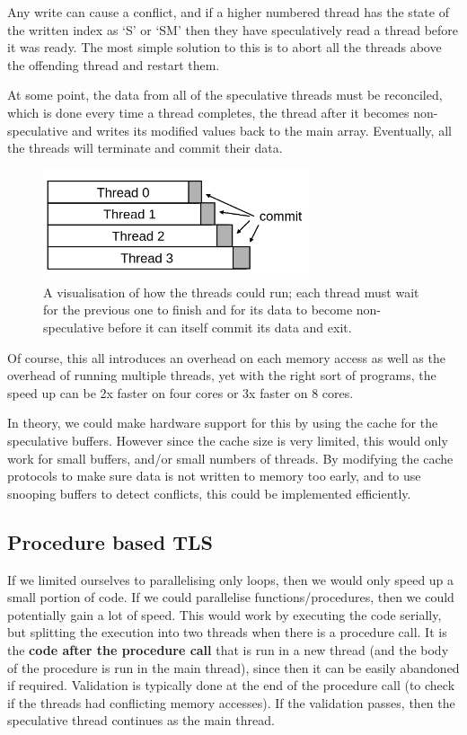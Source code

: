 Any write can cause a conflict, and if a higher numbered thread has
the state of the written index as `S' or `SM' then they have
speculatively read a thread before it was ready. The most simple
solution to this is to abort all the threads above the offending
thread and restart them.

At some point, the data from all of the speculative threads must be
reconciled, which is done every time a thread completes, the thread
after it becomes non-speculative and writes its modified values back
to the main array. Eventually, all the threads will terminate and
commit their data.

\begin{figure}[H]
\centering
\includegraphics[width=0.7\textwidth]{diagrams/commit-diagram}
\caption{A visualisation of how the threads could run; each thread
must wait for the previous one to finish and for its data to become
non-speculative before it can itself commit its data and exit.}
\end{figure}

Of course, this all introduces an overhead on each memory access as
well as the overhead of running multiple threads, yet with the right
sort of programs, the speed up can be 2x faster on four cores or 3x
faster on 8 cores.

In theory, we could make hardware support for this by using the cache
for the speculative buffers. However since the cache size is very
limited, this would only work for small buffers, and/or small numbers
of threads. By modifying the cache protocols to make sure data is not
written to memory too early, and to use snooping buffers to detect
conflicts, this could be implemented efficiently.

\subsection{Procedure based TLS}

If we limited ourselves to parallelising only loops, then we would
only speed up a small portion of code. If we could parallelise
functions/procedures, then we could potentially gain a lot of
speed. This would work by executing the code serially, but splitting
the execution into two threads when there is a procedure call. It is
the \textbf{code after the procedure call} that is run in a new thread
(and the body of the procedure is run in the main thread), since then
it can be easily abandoned if required. Validation is typically done
at the end of the procedure call (to check if the threads had
conflicting memory accesses). If the validation passes, then the
speculative thread continues as the main thread.

